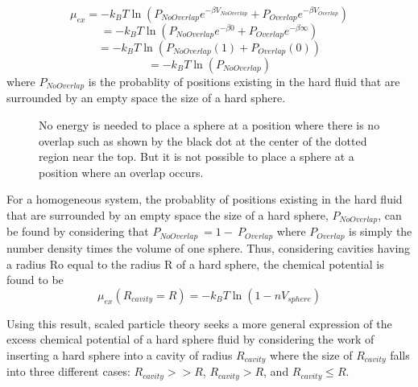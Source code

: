 \documentclass[double,12pt]{beavtex}
\begin{document}
\begin{equation}\mu_{ex}=-k_BT\ln\left(P_{NoOverlap}e^{-\beta{V}_{NoOverlap}}+P_{Overlap}e^{-\beta{V}_{Overlap}}\right)\end{equation}
\begin{equation}=-k_BT\ln\left(P_{NoOverlap}e^{-\beta{0}}+P_{Overlap}e^{-\beta\infty}\right)\end{equation}
\begin{equation}=-k_BT\ln\left(P_{NoOverlap}(1)+P_{Overlap}(0)\right)\end{equation}
\begin{equation}=-k_BT\ln\left(P_{NoOverlap}\right)\end{equation}
where $P_{NoOverlap}$ is the probablity of positions existing in the hard fluid that are surrounded by an empty space the size of a hard sphere.

\begin{figure}[h!]
    \centering
    \caption{No energy is needed to place a sphere at a position where there is no overlap such 
             as shown by the black dot at the center of the dotted region near the top. 
             But it is not possible to place a sphere at a position where an overlap occurs.}
    \label{fig:p_overlap}
  \end{figure}

For a homogeneous system, the probablity of positions existing in the hard fluid that are surrounded 
by an empty space the size of a hard sphere, $P_{NoOverlap}$, can be found by considering 
that $P_{NoOverlap}~=1-~P_{Overlap}$ where $P_{Overlap}$ is simply the number density times the volume of one sphere. 
\color{red}Thus, considering cavities having a radius Ro equal to the radius R of a hard sphere, the chemical potential is found to be \color{black}
\begin{equation}\label{mu_excess}\mu_{ex}(R_{cavity}=R)=-k_BT\ln\left(1-nV_{sphere}\right)\end{equation}


Using this result, scaled particle theory seeks a more general expression of the excess chemical potential of 
a hard sphere fluid by considering the work of inserting a hard sphere into a cavity of radius $R_{cavity}$ 
where the size of $R_{cavity}$ falls into three different cases: $R_{cavity} >> R$, $R_{cavity} > R$, and $R_{cavity} \leq R$. 
\end{document}
